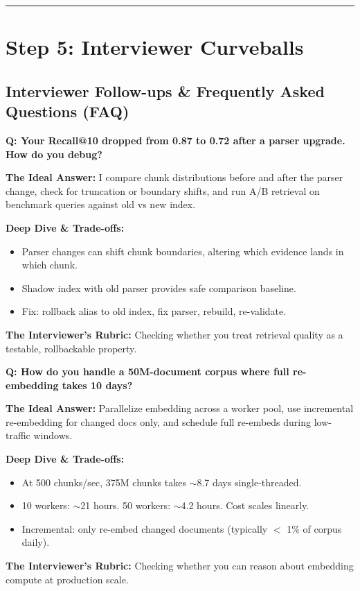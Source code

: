 \bigskip\hrule\bigskip

\section*{Step 5: Interviewer Curveballs}

\subsection*{Interviewer Follow-ups \& Frequently Asked Questions (FAQ)}

\textbf{Q: Your Recall@10 dropped from 0.87 to 0.72 after a parser upgrade. How do you debug?}

\textbf{The Ideal Answer:} I compare chunk distributions before and after the parser change, check for truncation or boundary shifts, and run A/B retrieval on benchmark queries against old vs new index.

\textbf{Deep Dive \& Trade-offs:}
\begin{itemize}
  \item Parser changes can shift chunk boundaries, altering which evidence lands in which chunk.
  \item Shadow index with old parser provides safe comparison baseline.
  \item Fix: rollback alias to old index, fix parser, rebuild, re-validate.
\end{itemize}

\textbf{The Interviewer's Rubric:} Checking whether you treat retrieval quality as a testable, rollbackable property.

\textbf{Q: How do you handle a 50M-document corpus where full re-embedding takes 10 days?}

\textbf{The Ideal Answer:} Parallelize embedding across a worker pool, use incremental re-embedding for changed docs only, and schedule full re-embeds during low-traffic windows.

\textbf{Deep Dive \& Trade-offs:}
\begin{itemize}
  \item At 500 chunks/sec, 375M chunks takes $\sim$8.7 days single-threaded.
  \item 10 workers: $\sim$21 hours. 50 workers: $\sim$4.2 hours. Cost scales linearly.
  \item Incremental: only re-embed changed documents (typically $<$ 1\% of corpus daily).
\end{itemize}

\textbf{The Interviewer's Rubric:} Checking whether you can reason about embedding compute at production scale.

